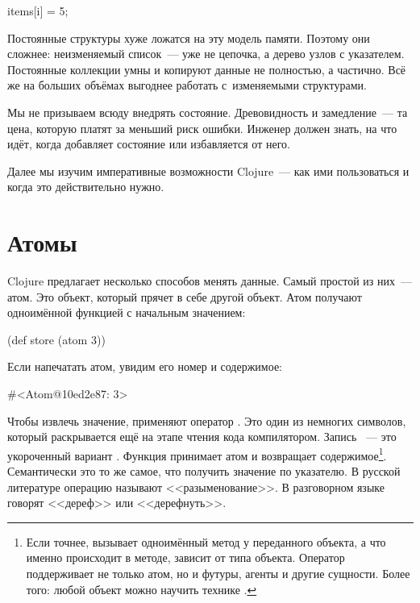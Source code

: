 \begin{python}
items[i] = 5;
\end{python}

Постоянные структуры хуже ложатся на эту модель памяти. Поэтому они сложнее:
неизменяемый список~--- уже не цепочка, а дерево узлов с указателем. Постоянные
коллекции умны и копируют данные не полностью, а частично. Всё же на больших
объёмах выгоднее работать с~изменяемыми структурами.

Мы не призываем всюду внедрять состояние. Древовидность и замедление~--- та
цена, которую платят за меньший риск ошибки. Инженер должен знать, на что идёт,
когда добавляет состояние или избавляется от него.

Далее мы изучим императивные возможности Clojure~--- как ими пользоваться и
когда это действительно нужно.

\section{Атомы}


Clojure предлагает несколько способов менять данные. Самый простой из них~---
атом. Это объект, который прячет в себе другой объект. Атом получают одноимённой
функцией с начальным значением:

\begin{clojure}
(def store (atom 3))
\end{clojure}

Если напечатать атом, увидим его номер и содержимое:

\begin{clojure}
#<Atom@10ed2e87: 3>
\end{clojure}

Чтобы извлечь значение, применяют оператор . Это один из немногих
символов, который раскрывается ещё на этапе чтения кода компилятором. Запись
~--- это укороченный вариант . Функция
 принимает атом и возвращает содержимое\footnote{Если точнее,
   вызывает одноимённый метод у переданного объекта, а что именно
  происходит в методе, зависит от типа объекта. Оператор  поддерживает
  не только атом, но и футуры, агенты и другие сущности. Более того: любой
  объект можно научить технике .}. Семантически это то же самое,
что получить значение по указателю. В русской литературе операцию называют
<<разыменование>>. В разговорном языке говорят <<дереф>> или <<дерефнуть>>.

